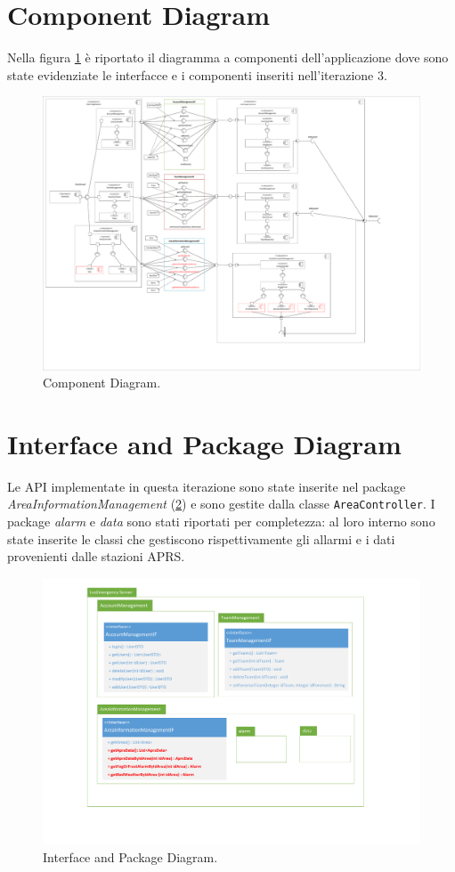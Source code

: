 \section{Component Diagram}
Nella figura \ref{fig:ComponentDiagram_iterazione3} è riportato il diagramma a componenti dell'applicazione dove sono state evidenziate le interfacce e i componenti inseriti nell'iterazione 3. 
\begin{figure}[h!]
	\centering
	\includegraphics[width=1\linewidth]{./Iterazione 3/OtherFiles/UML - Component view}
	\caption{Component Diagram.}
	\label{fig:ComponentDiagram_iterazione3}
\end{figure}

\clearpage

\section{Interface and Package Diagram}
Le API implementate in questa iterazione sono state inserite nel package \textit{AreaInformationManagement} (\Fig\ref{fig:InterfaceDiagram_iterazione3}) e sono gestite dalla classe \texttt{AreaController}. I package \textit{alarm} e \textit{data} sono stati riportati per completezza: al loro interno sono state inserite le classi che gestiscono rispettivamente gli allarmi e i dati provenienti dalle stazioni APRS.

\begin{figure}[h!]
	\centering
	\includegraphics[width=0.8\linewidth]{./Iterazione 3/OtherFiles/UML - Interface Diagram}
	\caption{Interface and Package Diagram.}
\label{fig:InterfaceDiagram_iterazione3}
\end{figure}